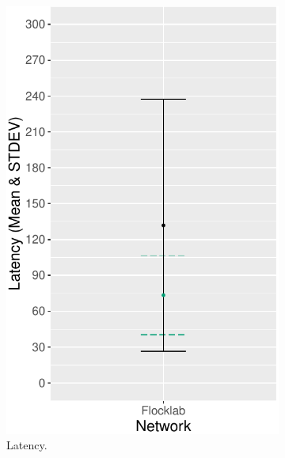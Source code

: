\begin{figure}[bt]
\begin{subfigure}{0.24\textwidth}
        \includegraphics[width=\textwidth, keepaspectratio]{figure/Results/ChaosComparison/Flocklab/FlocklabComparison_Latency.pdf}
        \caption{Latency.}
        \label{subfig:flocklab-latency}
    \end{subfigure}
    \begin{subfigure}{0.24\textwidth}
        \centering

\end{subfigure}
\end{figure}
